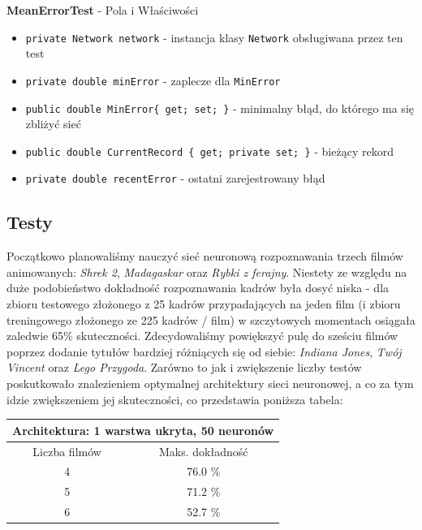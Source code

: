 \documentclass[12pt,a4paper]{article}
\begin{document}
    
    \textbf{MeanErrorTest} - Pola i Właściwości
    \begin{itemize}
        \item \lstinline|private Network network| - instancja klasy \lstinline{Network} obsługiwana przez ten test
        \item \lstinline|private double minError| - zaplecze dla \lstinline{MinError}
        \item \lstinline|public double MinError{ get; set; }| - minimalny błąd, do którego ma się zbliżyć sieć
        \item \lstinline|public double CurrentRecord { get; private set; }| - bieżący rekord
        \item \lstinline|private double recentError| - ostatni zarejestrowany błąd
    \end{itemize}
        
	\subsection*{Testy}

\hspace{20pt} Początkowo planowaliśmy nauczyć sieć neuronową rozpoznawania trzech filmów animowanych: \textit{Shrek 2}, \textit{Madagaskar} oraz \textit{Rybki z ferajny}. Niestety ze względu na duże podobieństwo dokładność rozpoznawania kadrów była dosyć niska - dla zbioru testowego złożonego z 25 kadrów przypadających na jeden film (i zbioru treningowego złożonego ze 225 kadrów / film) w szczytowych momentach osiągała zaledwie 65\% skuteczności. Zdecydowaliśmy powiększyć pulę do sześciu filmów poprzez dodanie tytułów bardziej różniących się od siebie: \textit{Indiana Jones}, \textit{Twój Vincent} oraz \textit{Lego Przygoda}. Zarówno to jak i zwiększenie liczby testów poskutkowało znalezieniem optymalnej architektury sieci neuronowej, a co za tym idzie zwiększeniem jej skuteczności, co przedstawia poniższa tabela:
	
\begin{center}
\begin{tabular}{|| c | c ||} 
\hline
\multicolumn{2}{||c||}{Architektura: 1 warstwa ukryta, 50 neuronów} \\
 \hline
 Liczba filmów & Maks. dokładność \\
 \hline
 4 & 76.0 \% \\
 \hline
 5 & 71.2 \% \\ 
 \hline
 6 & 52.7 \% \\ 
 \hline
\end{tabular}
\end{center}
\end{document}
